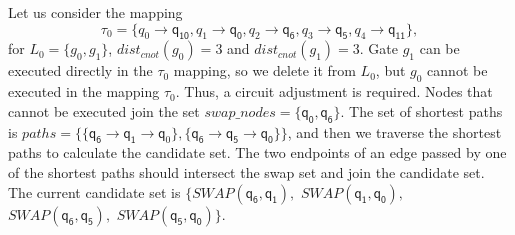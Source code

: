 \documentclass[runningheads]{llncs}
\begin{document}
\begin{example}
	Let us consider the mapping $$\tau_{0}=\{\textit{q}_\textit{0}\rightarrow  \textsf{q}_{\textsf{10}},\textit{q}_\textit{1}\rightarrow \textsf{q}_{\textsf{0}},
\textit{q}_\textit{2}\rightarrow  \textsf{q}_{\textsf{6}},\textit{q}_\textit{3}\rightarrow  \textsf{q}_{\textsf{5}},\textit{q}_\textit{4}\rightarrow  \textsf{q}_{\textsf{11}}\} , $$ 
for $L_{0}=\{g_{0},g_{1}\}$, $dist_{cnot}(g_{0})=3$ and $dist_{cnot}(g_{1})=3$. 
Gate $g_{1}$ can be executed directly in the $\tau_{0}$ mapping, so we delete it from $L_{0}$,
but $g_{0}$ cannot be executed in the mapping $\tau_{0}$.
Thus, a circuit adjustment is required. 
Nodes that cannot be executed join the set $swap\_nodes=\{\textsf{q}_{\textsf{0}},\textsf{q}_\textsf{6}\}$.
The set of shortest paths is $paths=\{\{\textsf{q}_{\textsf{6}}\rightarrow \textsf{q}_{\textsf{1}} \rightarrow \textsf{q}_{0} \},\{\textsf{q}_\textsf{6}\rightarrow \textsf{q}_\textsf{5} \rightarrow \textsf{q}_\textsf{0} \}\}$, 
and then we traverse the shortest paths to calculate the  candidate set.
The two endpoints of an edge passed by one of the shortest paths should intersect the swap set and join the candidate set.
The current candidate set is $\{SWAP(\textsf{q}_\textsf{6},\textsf{q}_\textsf{1}),$ $SWAP(\textsf{q}_\textsf{1},\textsf{q}_\textsf{0}),$ $SWAP(\textsf{q}_\textsf{6},\textsf{q}_\textsf{5}),$ $SWAP(\textsf{q}_\textsf{5},\textsf{q}_\textsf{0}) \}$.
\end{example}
\end{document}
